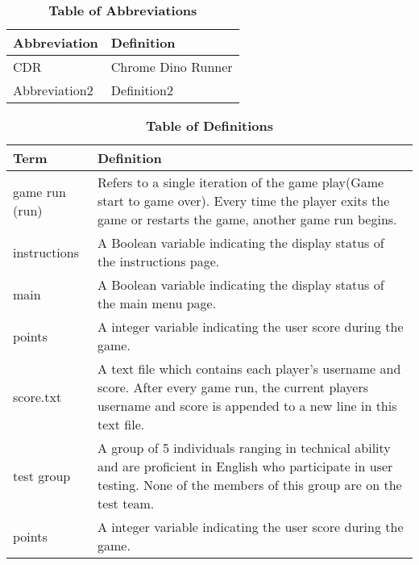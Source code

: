 \documentclass[12pt, titlepage]{article}
\begin{document}
\begin{table}[hbp]
    \caption{\textbf{Table of Abbreviations}} \label{Table}
    
    \begin{tabularx}{\textwidth}{p{3cm}X}
    \toprule
    \textbf{Abbreviation} & \textbf{Definition} \\
    \midrule
    CDR & Chrome Dino Runner\\
    Abbreviation2 & Definition2\\
    \bottomrule
    \end{tabularx}
    
    \end{table}
    

\begin{table}[!htbp]
\caption{\textbf{Table of Definitions}} \label{Table}

\begin{tabularx}{\textwidth}{p{3cm}X}
\toprule
\textbf{Term} & \textbf{Definition}\\
\midrule
game run (run) & Refers to a single iteration of the game play(Game start to game over). Every time the player exits the game or restarts the game, another game run begins.\\

instructions & A Boolean variable indicating the display status of the instructions page.\\

main & A Boolean variable indicating the display status of the main menu page. \\

points & A integer variable indicating the user score during the game. \\

score.txt & A text file which contains each player's username and score. After every game run, the current players username and score is appended to a new line in this text file.\\

test group & A group of 5 individuals ranging in technical ability and are proficient in English who participate in user testing. None of the members of this group are on the test team.  \\

points & A integer variable indicating the user score during the game. \\
\bottomrule
\end{tabularx}

\end{table}	
\end{document}
